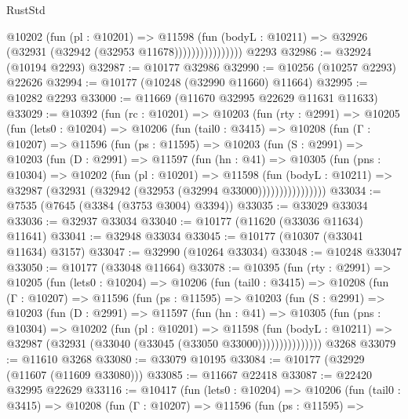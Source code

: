 \begin{lexlean}{RustStd}
\begin{coremodule}
                        @10202
                          (fun (pl : @10201) =>
                          @11598
                            (fun (bodyL : @10211) =>
                            @32926 (@32931 (@32942 (@32953 @11678))))))))))))))))
    @2293
@32986 := @32924 (@10194 @2293)
@32987 := @10177 @32986
@32990 := @10256 (@10257 @2293) @22626
@32994 := @10177 (@10248 (@32990 @11660) @11664)
@32995 := @10282 @2293
@33000 := @11669 (@11670 @32995 @22629 @11631 @11633)
@33029 := @10392
    (fun (rc : @10201) =>
    @10203
      (fun (rty : @2991) =>
      @10205
        (fun (lets0 : @10204) =>
        @10206
          (fun (tail0 : @3415) =>
          @10208
            (fun (Γ : @10207) =>
            @11596
              (fun (ps : @11595) =>
              @10203
                (fun (S : @2991) =>
                @10203
                  (fun (D : @2991) =>
                  @11597
                    (fun (hn : @41) =>
                    @10305
                      (fun (pns : @10304) =>
                      @10202
                        (fun (pl : @10201) =>
                        @11598
                          (fun (bodyL : @10211) =>
                          @32987 (@32931 (@32942 (@32953 (@32994 @33000))))))))))))))))
@33034 := @7535 (@7645 (@3384 (@3753 @3004) @3394))
@33035 := @33029 @33034
@33036 := @32937 @33034
@33040 := @10177 (@11620 (@33036 @11634) @11641)
@33041 := @32948 @33034
@33045 := @10177 (@10307 (@33041 @11634) @3157)
@33047 := @32990 (@10264 @33034)
@33048 := @10248 @33047
@33050 := @10177 (@33048 @11664)
@33078 := @10395
    (fun (rty : @2991) =>
    @10205
      (fun (lets0 : @10204) =>
      @10206
        (fun (tail0 : @3415) =>
        @10208
          (fun (Γ : @10207) =>
          @11596
            (fun (ps : @11595) =>
            @10203
              (fun (S : @2991) =>
              @10203
                (fun (D : @2991) =>
                @11597
                  (fun (hn : @41) =>
                  @10305
                    (fun (pns : @10304) =>
                    @10202
                      (fun (pl : @10201) =>
                      @11598
                        (fun (bodyL : @10211) =>
                        @32987 (@32931 (@33040 (@33045 (@33050 @33000)))))))))))))))
    @3268
@33079 := @11610 @3268
@33080 := @33079 @10195
@33084 := @10177 (@32929 (@11607 (@11609 @33080)))
@33085 := @11667 @22418
@33087 := @22420 @32995 @22629
@33116 := @10417
    (fun (lets0 : @10204) =>
    @10206
      (fun (tail0 : @3415) =>
      @10208
        (fun (Γ : @10207) =>
        @11596
          (fun (ps : @11595) =>

\end{coremodule}
\end{lexlean}

